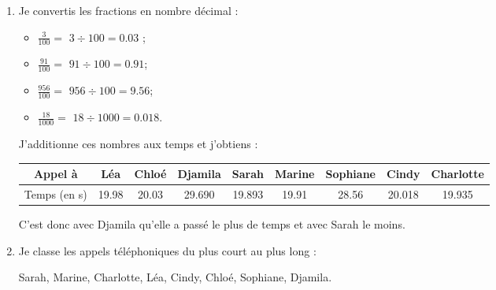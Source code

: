 \documentclass[xcolor={dvipsnames}]{beamer}
\begin{document}
\begin{frame}
	\begin{enumerate}
		\item Je convertis les fractions en nombre décimal :
		
		\begin{itemize}
			\item $ \frac{3}{100} =$ \pause $ 3 \div 100 = \num{0.03}$ ;\pause
			\item  $\frac{91}{100} = $ \pause $91 \div 100 = \num{0.91}$;\pause
			\item $\frac{956}{100} = $ \pause $956 \div 100 = \num{9.56}$;\pause
			\item $\frac{18}{1000} = $ \pause $18 \div 1000 = \num{0.018}$.
		\end{itemize}
		  
		
		J'additionne ces nombres aux temps et j'obtiens :
		
		{\footnotesize \begin{tabular}{|@{\ }c@{\ }|@{\ }c@{\ }|@{\ }c@{\ }|@{\ }c@{\ }|@{\ }c@{\ }|@{\ }c@{\ }|@{\ }c@{\ }|@{\ }c@{\ }|@{\ }c@{\ }|}
			\hline
			Appel à      & Léa         & Chloé       & Djamila      & Sarah        & Marine      & Sophiane    & Cindy        & Charlotte    \\ \hline
			Temps (en s) & \num{19.98} & \num{20.03} & \num{29.690} & \num{19.893} & \num{19.91} & \num{28.56} & \num{20.018} & \num{19.935} \\ \hline
		\end{tabular}}
	
	\vspace*{0.2cm}
		
		C'est donc avec Djamila qu'elle a passé le plus de temps et avec Sarah le moins.
		
		\item Je classe les appels téléphoniques du plus court au plus long :
		
		Sarah, Marine, Charlotte, Léa, Cindy, Chloé, Sophiane, Djamila.
	\end{enumerate}
\end{frame}
\end{document}
